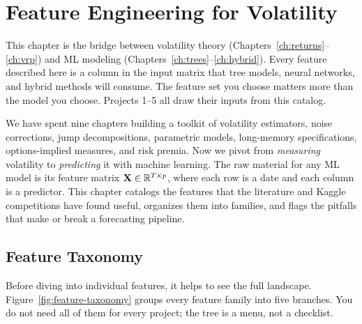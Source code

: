 
\chapter{Feature Engineering for Volatility}\label{ch:features}

\begin{application}
This chapter is the bridge between volatility theory (Chapters~\ref{ch:returns}--\ref{ch:vrp}) and ML modeling (Chapters~\ref{ch:trees}--\ref{ch:hybrid}).
Every feature described here is a column in the input matrix that tree models, neural networks, and hybrid methods will consume.
The feature set you choose matters more than the model you choose.
Projects 1--5 all draw their inputs from this catalog.
\end{application}

We have spent nine chapters building a toolkit of volatility estimators, noise corrections, jump decompositions, parametric models, long-memory specifications, options-implied measures, and risk premia.
Now we pivot from \emph{measuring} volatility to \emph{predicting} it with machine learning.
The raw material for any ML model is its feature matrix $\mathbf{X} \in \mathbb{R}^{T \times p}$, where each row is a date and each column is a predictor.
This chapter catalogs the features that the literature and Kaggle competitions have found useful, organizes them into families, and flags the pitfalls that make or break a forecasting pipeline.

\section{Feature Taxonomy}\label{sec:feat-taxonomy}

Before diving into individual features, it helps to see the full landscape.
Figure~\ref{fig:feature-taxonomy} groups every feature family into five branches.
You do not need all of them for every project; the tree is a menu, not a checklist.

